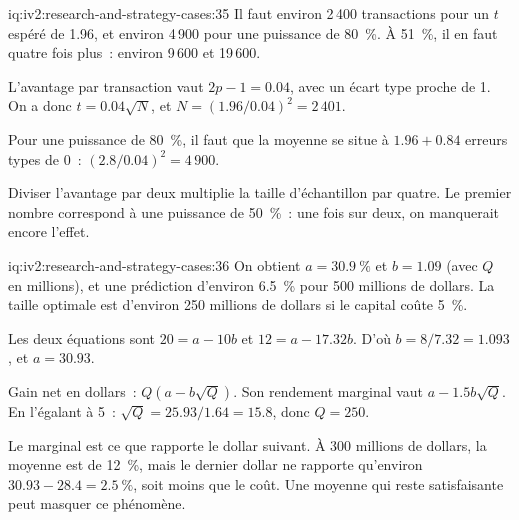 \begin{solution}{iq:iv2:research-and-strategy-cases:35}
Il faut environ 2\,400 transactions pour un $t$ espéré de 1.96, et environ 4\,900 pour une puissance de 80~\%. À 51~\%, il en faut quatre fois plus~: environ 9\,600 et 19\,600.

L'avantage par transaction vaut $2p - 1 = 0.04$, avec un écart type proche de 1. On a donc $t = 0.04\sqrt{N}$, et $N = (1.96/0.04)^2 = 2\,401$.

Pour une puissance de 80~\%, il faut que la moyenne se situe à $1.96 + 0.84$ erreurs types de 0~: $(2.8/0.04)^2 = 4\,900$.

Diviser l'avantage par deux multiplie la taille d'échantillon par quatre. Le premier nombre correspond à une puissance de 50~\%~: une fois sur deux, on manquerait encore l'effet.

\end{solution}

\begin{solution}{iq:iv2:research-and-strategy-cases:36}
On obtient $a = 30.9~\%$ et $b = 1.09$ (avec $Q$ en millions), et une prédiction d'environ 6.5~\% pour 500 millions de dollars. La taille optimale est d'environ 250 millions de dollars si le capital coûte 5~\%.

Les deux équations sont $20 = a - 10b$ et $12 = a - 17.32b$. D'où $b = 8/7.32 = 1.093$, et $a = 30.93$.

Gain net en dollars~: $Q(a - b\sqrt{Q})$. Son rendement marginal vaut $a - 1.5b\sqrt{Q}$. En l'égalant à 5~: $\sqrt{Q} = 25.93/1.64 = 15.8$, donc $Q = 250$.

Le marginal est ce que rapporte le dollar suivant. À 300 millions de dollars, la moyenne est de 12~\%, mais le dernier dollar ne rapporte qu'environ $30.93 - 28.4 = 2.5~\%$, soit moins que le coût. Une moyenne qui reste satisfaisante peut masquer ce phénomène.

\end{solution}

